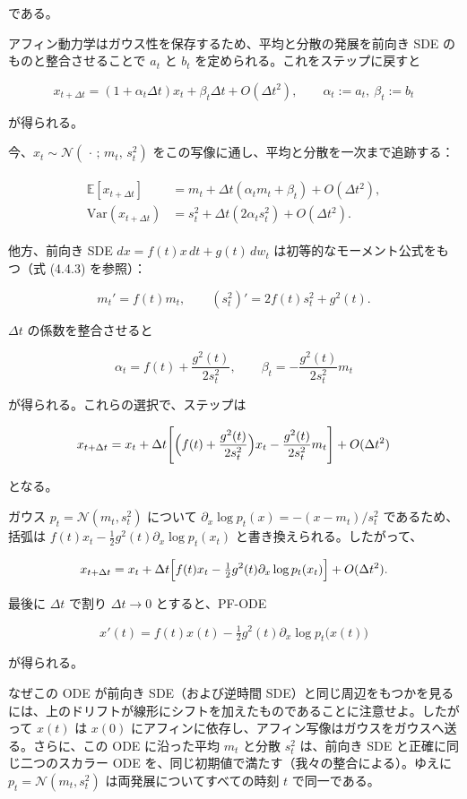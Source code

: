 である。

アフィン動力学はガウス性を保存するため、平均と分散の発展を前向き SDE のものと整合させることで $a_t$ と $b_t$ を定められる。これをステップに戻すと

\[
x_{t+\Delta t}=(1+\alpha_t\Delta t)x_t+\beta_t\Delta t+O(\Delta t^2),
\qquad \alpha_t:=a_t,\ \beta_t:=b_t
\]


が得られる。

今、$x_t\sim\mathcal{N}(\,\cdot\,;\, m_t,\, s_t^2)$ をこの写像に通し、平均と分散を一次まで追跡する：

\begin{align*}
\begin{aligned}
\mathbb{E}[x_{t+\Delta t}] &= m_t + \Delta t(\alpha_t m_t + \beta_t) + O(\Delta t^2), \\
\mathrm{Var}(x_{t+\Delta t}) &= s_t^2 + \Delta t(2\alpha_t s_t^2) + O(\Delta t^2).
\end{aligned}
\end{align*}


他方、前向き SDE $dx=f(t)x\,dt+g(t)\,dw_t$ は初等的なモーメント公式をもつ（式 (4.4.3) を参照）：

\[
m_t'=f(t)m_t, \qquad (s_t^2)'=2f(t)s_t^2+g^2(t).
\]


$\Delta t$ の係数を整合させると

\[
\alpha_t=f(t)+\frac{g^2(t)}{2s_t^2}, \qquad
\beta_t=-\frac{g^2(t)}{2s_t^2}m_t
\]


が得られる。これらの選択で、ステップは

\[
x_{t+\Delta t}
= x_t
+ \Delta t\Biggl[
\Bigl(f(t)+\frac{g^2(t)}{2s_t^2}\Bigr)x_t
- \frac{g^2(t)}{2s_t^2}m_t
\Biggr]
+ O(\Delta t^2)
\]


となる。

ガウス $p_t=\mathcal{N}(m_t,s_t^2)$ について $\partial_x\log p_t(x)=-(x-m_t)/s_t^2$ であるため、括弧は $f(t)x_t-\tfrac12 g^2(t)\partial_x\log p_t(x_t)$ と書き換えられる。したがって、

\[
x_{t+\Delta t}
= x_t
+ \Delta t\Bigl[f(t)x_t-\tfrac12 g^2(t)\partial_x\log p_t(x_t)\Bigr]
+ O(\Delta t^2).
\]


最後に $\Delta t$ で割り $\Delta t\to 0$ とすると、PF-ODE

\[
x'(t)=f(t)x(t)-\tfrac12 g^2(t)\partial_x\log p_t\bigl(x(t)\bigr)
\]


が得られる。

なぜこの ODE が前向き SDE（および逆時間 SDE）と同じ周辺をもつかを見るには、上のドリフトが線形にシフトを加えたものであることに注意せよ。したがって $x(t)$ は $x(0)$ にアフィンに依存し、アフィン写像はガウスをガウスへ送る。さらに、この ODE に沿った平均 $m_t$ と分散 $s_t^2$ は、前向き SDE と正確に同じ二つのスカラー ODE を、同じ初期値で満たす（我々の整合による）。ゆえに $p_t=\mathcal{N}(m_t,s_t^2)$ は両発展についてすべての時刻 $t$ で同一である。

